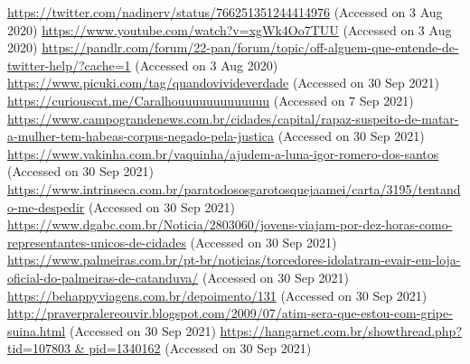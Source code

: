 \documentclass[output=paper]{langscibook}
\begin{document}
\begin{exe}
        \ex \url{https://twitter.com/nadinerv/status/766251351244414976} {(Accessed on 3 Aug 2020)}
        \ex \url{https://www.youtube.com/watch?v=xgWk4Oo7TUU} {(Accessed on 3 Aug 2020)}
    \z
     \url{https://pandlr.com/forum/22-pan/forum/topic/off-alguem-que-entende-de-twitter-help/?cache=1} {(Accessed on 3 Aug 2020)}
     \url{https://www.picuki.com/tag/quandovivideverdade} {(Accessed on 30 Sep 2021)}
     \url{https://curiouscat.me/Caralhouuuuuuuuuuuuu} {(Accessed on 7 Sep 2021)}
     \url{https://www.campograndenews.com.br/cidades/capital/rapaz-suspeito-de-matar-a-mulher-tem-habeas-corpus-negado-pela-justica} {(Accessed on 30 Sep 2021)}
     \url{https://www.vakinha.com.br/vaquinha/ajudem-a-luna-igor-romero-dos-santos} {(Accessed on 30 Sep 2021)}
     \url{https://www.intrinseca.com.br/paratodososgarotosquejaamei/carta/3195/tentando-me-despedir} {(Accessed on 30 Sep 2021)}
      \url{https://www.dgabc.com.br/Noticia/2803060/jovens-viajam-por-dez-horas-como-representantes-unicos-de-cidades} {(Accessed on 30 Sep 2021)}
      \url{https://www.palmeiras.com.br/pt-br/noticias/torcedores-idolatram-evair-em-loja-oficial-do-palmeiras-de-catanduva/} {(Accessed on 30 Sep 2021)}
      \url{https://behappyviagens.com.br/depoimento/131} {(Accessed on 30 Sep 2021)}
        \ea\url{http://praverpralereouvir.blogspot.com/2009/07/atim-sera-que-estou-com-gripe-suina.html} {(Accessed on 30 Sep 2021)}
        \ex \url{https://hangarnet.com.br/showthread.php?tid=107803 & pid=1340162} {(Accessed on 30 Sep 2021)}
    \z
\end{exe}
    
\printbibliography[heading=subbibliography]
\end{document}
